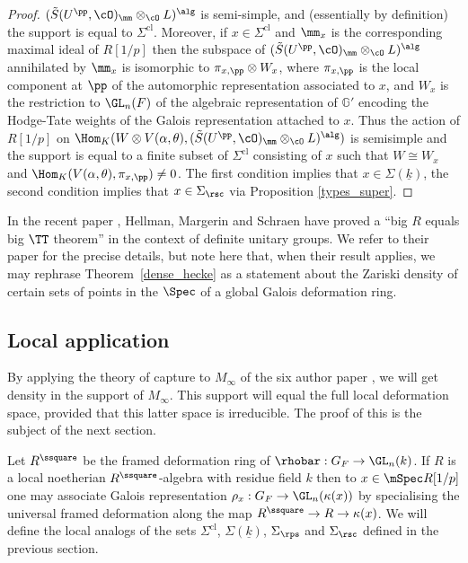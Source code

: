 \begin{proof}
$(\tilde{S}(U^{\pp}, \cO)_{\mm}\otimes_{\cO} L)^\alg$ is semi-simple, and (essentially by definition) the support is equal to $\Sigma^{\mathrm{cl}}$.
Moreover, if $x\in \Sigma^{\mathrm{cl}}$ and $\mm_x$ is the corresponding maximal ideal of $R[1/p]$ then the subspace of $(\tilde{S}(U^{\pp}, \cO)_{\mm}\otimes_{\cO} L)^\alg$ annihilated by $\mm_x$ is isomorphic to $\pi_{x,\pp} \otimes W_x$, where
$\pi_{x,\pp}$ is the local component at $\pp$ of the automorphic representation associated to $x$, and $W_x$ is the restriction to $\GL_n(F)$ of the algebraic representation of $\mathbb{G}'$ encoding the Hodge-Tate weights of the Galois
representation attached to $x$. Thus the action of $R[1/p]$ on
$\Hom_K( W\otimes V(\alpha, \theta), (\tilde{S}(U^{\pp}, \cO)_{\mm}\otimes_{\cO} L)^\alg)$ is semisimple and the support is equal to a finite subset of $\Sigma^{\mathrm{cl}}$ consisting of $x$ such that $W\cong W_x$ and
$\Hom_K(V(\alpha, \theta), \pi_{x, \pp})\neq 0$. The first condition implies that
$x\in \Sigma(\underline{k})$, the second condition implies that $x\in \Sigma_{\rsc}$ via Proposition \ref{types_super}.
\end{proof}

\begin{remark}
In the recent paper \cite{HMS}, Hellman, Margerin and Schraen have proved
a ``big $R$ equals big $\TT$ theorem'' in the context of definite unitary groups.
We refer to their paper for the precise details, but note here that, when their
result applies, we may rephrase Theorem~\ref{dense_hecke} as a statement
about the Zariski density of certain sets of points in the $\Spec$
of a global Galois deformation ring.
\end{remark}

\subsection{Local application}
By applying the theory of capture to $M_{\infty}$
of the six author paper \cite{six-authors}, we will get density in the support
of $M_{\infty}$. This support will equal the full local
deformation space, provided that this latter space is irreducible.
The proof of this is the subject of the next section.

Let $R^\ssquare$ be the framed deformation ring of $\rhobar: G_F \to \GL_n(k)$. If $R$ is a local noetherian $R^\ssquare$-algebra
with residue field $k$
then to $x\in \mSpec R[1/p]$ one may associate Galois representation $\rho_x: G_F\to \GL_n(\kappa(x))$ by specialising the universal framed deformation along the map $R^\ssquare\to R\to \kappa(x)$. We will define the local analogs of the sets $\Sigma^{\mathrm{cl}}$,
$\Sigma(\underline{k})$, $\Sigma_{\rps}$ and $\Sigma_{\rsc}$ defined in the previous section.

